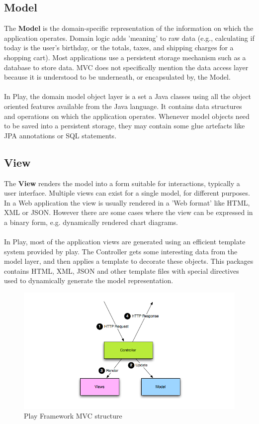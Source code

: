 \subsection{Model}
The \textbf{Model} is the domain-specific representation of the information on which the application operates.
Domain logic adds 'meaning' to raw data (e.g., calculating if today is the user's birthday, or the totals, taxes, and shipping charges for a shopping cart).
 Most applications use a persistent storage mechanism such as a database to store data.
MVC does not specifically mention the data access layer because it is understood to be underneath, or encapsulated by, the Model.
\\\\
In Play, the domain model object layer is a set a Java classes using all the object oriented features available from the Java language. 
It contains data structures and operations on which the application operates. 
Whenever model objects need to be saved into a persistent storage, they may contain some glue artefacts like JPA annotations or SQL statements.

\subsection{View}
The \textbf{View} renders the model into a form suitable for interactions, typically a user interface.
Multiple views can exist for a single model, for different purposes.
In a Web application the view is usually rendered in a 'Web format' like HTML, XML or JSON.
However there are some cases where the view can be expressed in a binary form, e.g. dynamically rendered chart diagrams.
\\\\
In Play, most of the application views are generated using an efficient template system provided by play. 
The Controller gets some interesting data from the model layer, and then applies a template to decorate these objects. 
This packages contains HTML, XML, JSON and other template files with special directives used to dynamically generate the model representation.
\\
\begin{figure}[h]
  \centering
    \captionsetup{justification=centering}
    \includegraphics[width=\textwidth]{play_mvc}
    \caption{Play Framework MVC structure}
  \label{play_mvc_image}
\end{figure}


